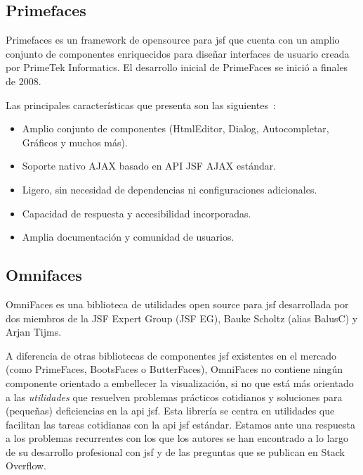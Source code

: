 \subsection{Primefaces}
\label{sec:primefaces}

Primefaces es un framework de \gls{opensource} para \acrshort{jsf} que cuenta con un amplio conjunto de componentes enriquecidos para diseñar interfaces de usuario creada por PrimeTek Informatics. El desarrollo inicial de PrimeFaces se inició a finales de 2008.

Las principales características que presenta son las siguientes~\cite{Primefaces}:
\begin{itemize}
\item Amplio conjunto de componentes (HtmlEditor, Dialog, Autocompletar, Gráficos y muchos más).
\item Soporte nativo AJAX basado en API JSF AJAX estándar. 
\item Ligero, sin necesidad de dependencias ni configuraciones adicionales. 
\item Capacidad de respuesta y accesibilidad incorporadas. 
\item Amplia documentación y comunidad de usuarios.
\end{itemize}


\subsection{Omnifaces}
\label{sec:omnifaces}

OmniFaces es una biblioteca de utilidades open source para \acrshort{jsf} desarrollada por dos miembros de la JSF Expert Group (JSF EG), Bauke Scholtz (alias BalusC) y Arjan Tijms.

A diferencia de otras bibliotecas de componentes \acrshort{jsf}  existentes en el mercado (como PrimeFaces, BootsFaces o ButterFaces), OmniFaces no contiene ningún componente orientado a embellecer la visualización, si no que está más orientado a las \textit{utilidades} que resuelven problemas prácticos cotidianos y soluciones para (pequeñas) deficiencias en la \acrshort{api}  \acrshort{jsf}. Esta librería se centra en utilidades que facilitan las tareas cotidianas con la \acrshort{api} \acrshort{jsf} estándar. Estamos ante una respuesta a los problemas recurrentes con los que los autores se han encontrado a lo largo de su desarrollo profesional con \acrshort{jsf} y de las preguntas que se publican en Stack Overflow.

